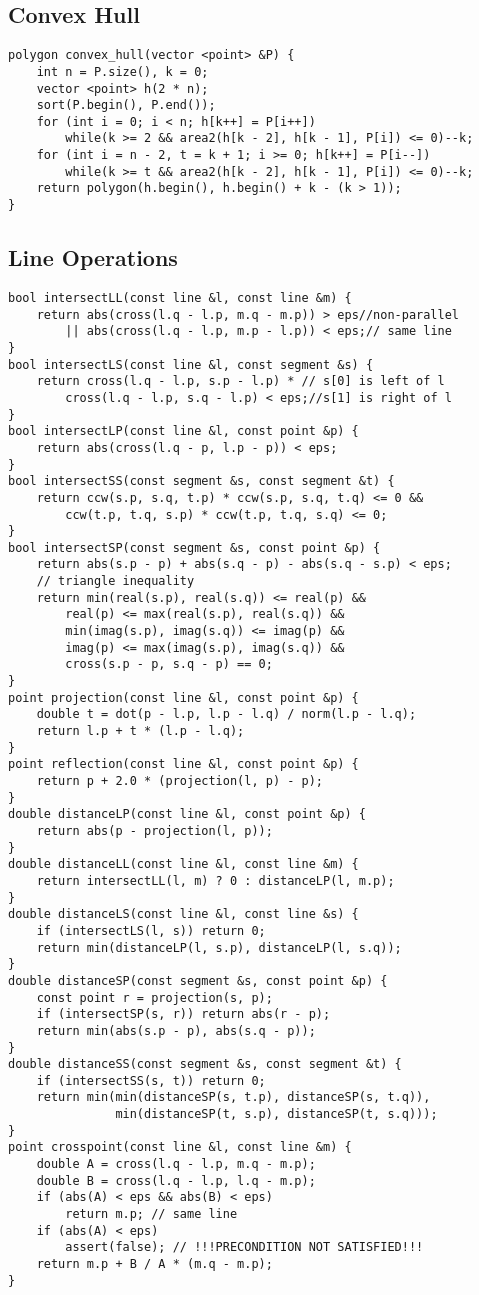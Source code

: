 \documentclass[landscape, 8pt, a4paper, oneside]{extarticle}
\begin{document}
\begin{multicols}{3}
\subsection{Convex Hull}
\begin{verbatim}
polygon convex_hull(vector <point> &P) {
    int n = P.size(), k = 0;
    vector <point> h(2 * n);
    sort(P.begin(), P.end());
    for (int i = 0; i < n; h[k++] = P[i++])
        while(k >= 2 && area2(h[k - 2], h[k - 1], P[i]) <= 0)--k;
    for (int i = n - 2, t = k + 1; i >= 0; h[k++] = P[i--])
        while(k >= t && area2(h[k - 2], h[k - 1], P[i]) <= 0)--k;
    return polygon(h.begin(), h.begin() + k - (k > 1));
}    
\end{verbatim}
\subsection{Line Operations}
\begin{verbatim}
bool intersectLL(const line &l, const line &m) {
    return abs(cross(l.q - l.p, m.q - m.p)) > eps//non-parallel
        || abs(cross(l.q - l.p, m.p - l.p)) < eps;// same line
}
bool intersectLS(const line &l, const segment &s) {
    return cross(l.q - l.p, s.p - l.p) * // s[0] is left of l
        cross(l.q - l.p, s.q - l.p) < eps;//s[1] is right of l
}
bool intersectLP(const line &l, const point &p) {
    return abs(cross(l.q - p, l.p - p)) < eps;
}
bool intersectSS(const segment &s, const segment &t) {
    return ccw(s.p, s.q, t.p) * ccw(s.p, s.q, t.q) <= 0 &&
        ccw(t.p, t.q, s.p) * ccw(t.p, t.q, s.q) <= 0;
}
bool intersectSP(const segment &s, const point &p) {
    return abs(s.p - p) + abs(s.q - p) - abs(s.q - s.p) < eps;
    // triangle inequality
    return min(real(s.p), real(s.q)) <= real(p) &&
        real(p) <= max(real(s.p), real(s.q)) &&
        min(imag(s.p), imag(s.q)) <= imag(p) &&
        imag(p) <= max(imag(s.p), imag(s.q)) &&
        cross(s.p - p, s.q - p) == 0;
}
point projection(const line &l, const point &p) {
    double t = dot(p - l.p, l.p - l.q) / norm(l.p - l.q);
    return l.p + t * (l.p - l.q);
}
point reflection(const line &l, const point &p) {
    return p + 2.0 * (projection(l, p) - p);
}
double distanceLP(const line &l, const point &p) {
    return abs(p - projection(l, p));
}
double distanceLL(const line &l, const line &m) {
    return intersectLL(l, m) ? 0 : distanceLP(l, m.p);
}
double distanceLS(const line &l, const line &s) {
    if (intersectLS(l, s)) return 0;
    return min(distanceLP(l, s.p), distanceLP(l, s.q));
}
double distanceSP(const segment &s, const point &p) {
    const point r = projection(s, p);
    if (intersectSP(s, r)) return abs(r - p);
    return min(abs(s.p - p), abs(s.q - p));
}
double distanceSS(const segment &s, const segment &t) {
    if (intersectSS(s, t)) return 0;
    return min(min(distanceSP(s, t.p), distanceSP(s, t.q)),
               min(distanceSP(t, s.p), distanceSP(t, s.q)));
}
point crosspoint(const line &l, const line &m) {
    double A = cross(l.q - l.p, m.q - m.p);
    double B = cross(l.q - l.p, l.q - m.p);
    if (abs(A) < eps && abs(B) < eps)
        return m.p; // same line
    if (abs(A) < eps)
        assert(false); // !!!PRECONDITION NOT SATISFIED!!!
    return m.p + B / A * (m.q - m.p);
}
\end{verbatim}

\end{multicols}
\end{document}
